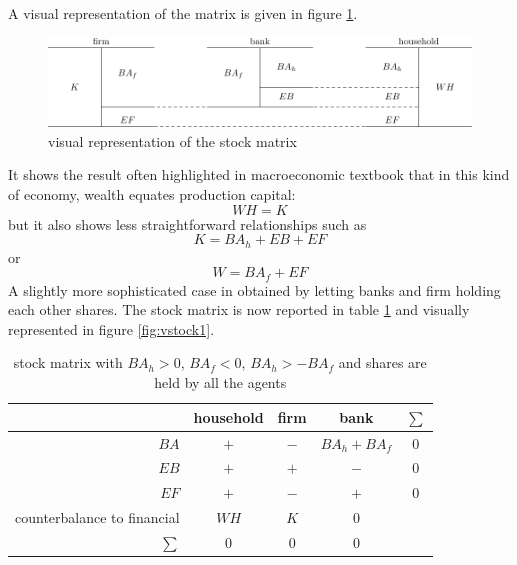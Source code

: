 \documentclass{article}
\begin{document}
A visual representation of the matrix is given in figure \ref{fig:vstock0}.
\begin{figure}[htp]
	\centering
\hskip-1cm
\includegraphics[scale=0.8]{balances-0.pdf}
	\caption{visual representation of the stock matrix}
	\label{fig:vstock0}
\end{figure}
It shows the result often highlighted in macroeconomic textbook that in this kind of economy, wealth equates production capital:
\[WH=K\]
but it also shows less straightforward relationships such as 
\[
	 K=BA_h+EB+EF
\]
or
\[
W=BA_f+EF
\]
A slightly more sophisticated case in obtained by letting banks and firm holding each other shares. The stock matrix is now reported in table \ref{tab:sm2} and visually represented in figure \ref{fig:vstock1}.

\begin{table}[t]
	\centering
\begin{tabular}{r c c c c}
	\hline
	& household 	& \parbox{1.5cm}{\centerline{firm}} & \parbox{1.5cm}{\centerline{bank}} &$\sum$\\
\hline
\hline
$BA$	&	$+$	&$-$	&$BA_h+BA_f$&0\\
$EB$	&	$+$	&$+$	&$-$&0\\
$EF$	&	$+$	&$-$	&$+$&0\\
	\hline
counterbalance to financial	&	$WH$	&$K$	&0\\
	\hline
	\hline
$\sum$ &	0	&0	&0
\end{tabular}
	\caption{stock matrix with $BA_h>0$, $BA_f<0$, $BA_h>-BA_f$ and shares are held by all the agents}
	\label{tab:sm2}
\end{table}
\end{document}
